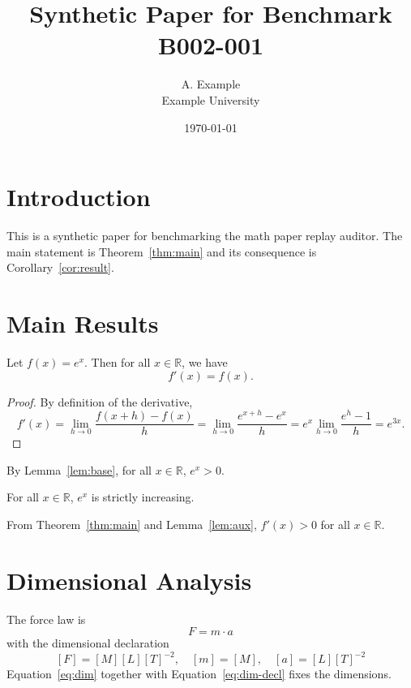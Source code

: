\documentclass{article}
\title{Synthetic Paper for Benchmark B002-001}
\author{A. Example \\ Example University}
\date{\today}
\begin{document}
\maketitle

\section{Introduction}
This is a synthetic paper for benchmarking the math paper replay auditor.
The main statement is Theorem~\ref{thm:main} and its consequence is
Corollary~\ref{cor:result}.

\section{Main Results}
\begin{theorem}
\label{thm:main}
Let $f(x) = e^x$. Then for all $x \in \mathbb{R}$, we have
\begin{equation}
\label{eq:main}
f'(x) = f(x).
\end{equation}
\end{theorem}

\begin{proof}
By definition of the derivative,
\begin{equation}
\label{eq:deriv}
f'(x) = \lim_{h \to 0} \frac{f(x+h) - f(x)}{h} = \lim_{h \to 0} \frac{e^{x+h} - e^x}{h} = e^x \lim_{h \to 0} \frac{e^h - 1}{h} = e^{3 x}.
\end{equation}
\end{proof}

\begin{lemma}
\label{lem:aux}
By Lemma~\ref{lem:base}, for all $x \in \mathbb{R}$, $e^x > 0$.
\end{lemma}

\begin{lemma}
\label{lem:base}
For all $x \in \mathbb{R}$, $e^x$ is strictly increasing.
\end{lemma}

\begin{corollary}
\label{cor:result}
From Theorem~\ref{thm:main} and Lemma~\ref{lem:aux}, $f'(x) > 0$ for all $x \in \mathbb{R}$.
\end{corollary}

\section{Dimensional Analysis}
The force law is
\begin{equation}
\label{eq:dim}
F = m \cdot a
\end{equation}
with the dimensional declaration
\begin{equation}
\label{eq:dim-decl}
[F] = [M][L][T]^{-2}, \quad [m] = [M], \quad [a] = [L][T]^{-2}
\end{equation}
Equation~\ref{eq:dim} together with Equation~\ref{eq:dim-decl} fixes the dimensions.
\end{document}
